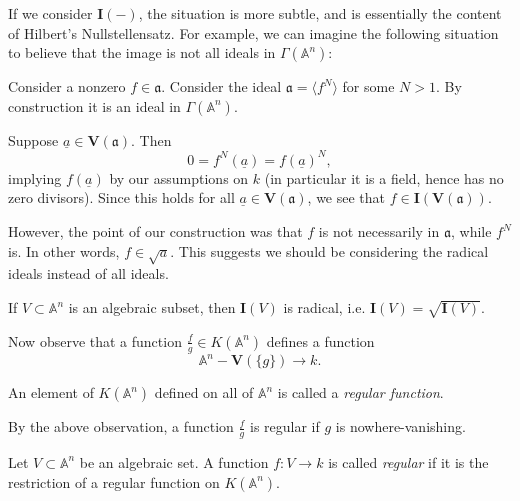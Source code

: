 \documentclass[12pt]{article}
\begin{document}
If we consider $\mathbf{I}(-)$, the situation is more subtle, and is essentially the content of Hilbert's Nullstellensatz. For example, we can imagine the following situation to believe that the image is not all ideals in $\Gamma(\mathbb{A}^n)$:

\begin{example}
\label{ex_fn_in_a_implies_f_in_iva}
	Consider a nonzero $f\in \mathfrak{a}$. Consider the ideal $\mathfrak{a} = \langle f^N\rangle$ for some $N>1$. By construction it is an ideal in $\Gamma(\mathbb{A}^n)$. 

	Suppose $\underline{a}\in \mathbf{V}(\mathfrak{a})$. Then
	\begin{equation*}
		0=f^N(\underline{a})=f(\underline{a})^N,
	\end{equation*}
	implying $f(\underline{a})$ by our assumptions on $k$ (in particular it is a field, hence has no zero divisors). Since this holds for all $\underline{a}\in\mathbf{V}(\mathfrak{a})$, we see that $f\in\mathbf{I}(\mathbf{V}(\mathfrak{a}))$.

	However, the point of our construction was that $f$ is not necessarily in $\mathfrak{a}$, while $f^N$ is. In other words, $f\in\sqrt{a}$. This suggests we should be considering the radical ideals instead of all ideals.
\end{example}

\begin{corollary}
\label{cor_iv_is_radical}
	If $V\subset\mathbb{A}^n$ is an algebraic subset, then $\mathbf{I}(V)$ is radical, i.e. $\mathbf{I}(V)=\sqrt{\mathbf{I}(V)}$. 
\end{corollary}

Now observe that a function $\frac{f}{g}\in K(\mathbb{A}^n)$ defines a function 
\begin{equation*}
	\mathbb{A}^n - \mathbf{V}(\{g\}) \to k.
\end{equation*}

\begin{definition}
	An element of $K(\mathbb{A}^n)$ defined on all of $\mathbb{A}^n$ is called a \emph{regular function}.
\end{definition}

By the above observation, a function $\frac{f}{g}$ is regular if $g$ is nowhere-vanishing. 

\begin{definition}
	Let $V\subset\mathbb{A}^n$ be an algebraic set. A function $f:V\to k$ is called \emph{regular} if it is the restriction of a regular function on $K(\mathbb{A}^n)$. 
\end{definition}
\end{document}
